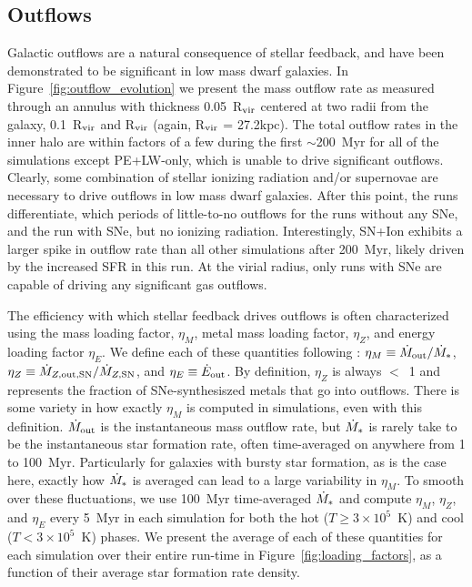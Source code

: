 \documentclass[twocolumn]{aastex62}
\begin{document}
\subsection{Outflows}
\label{sec:outflows}

Galactic outflows are a natural consequence of stellar feedback, and have been demonstrated to be significant in low mass dwarf galaxies. In Figure~\ref{fig:outflow_evolution} we present the mass outflow rate as measured through an annulus with thickness 0.05~R$_{\rm vir}$ centered at two radii from the galaxy, 0.1~R$_{\rm vir}$ and R$_{\rm vir}$ (again, R$_{\rm vir}$ = 27.2kpc). The total outflow rates in the inner halo are within factors of a few during the first $\sim$200~Myr for all of the simulations except PE+LW-only, which is unable to drive significant outflows. Clearly, some combination of stellar ionizing radiation and/or supernovae are necessary to drive outflows in low mass dwarf galaxies. After this point, the runs differentiate, which periods of little-to-no outflows for the runs without any SNe, and the run with SNe, but no ionizing radiation. Interestingly, SN+Ion exhibits a larger spike in outflow rate than all other simulations after 200~Myr, likely driven by the increased SFR in this run. At the virial radius, only runs with SNe are capable of driving any significant gas outflows. 

The efficiency with which stellar feedback drives outflows is often characterized using the mass loading factor, $\eta_M$, metal mass loading factor, $\eta_Z$, and energy loading factor $\eta_E$. We define each of these quantities following \cite{LiBryan2020}: $\eta_M \equiv \dot{M}_{\rm out} / \dot{M}_{\rm *}$, $\eta_Z \equiv \dot{M}_{Z,\rm{out},\rm{SN}} / \dot{M}_{Z,\rm{SN}}$, and $\eta_E \equiv \dot{E}_{\rm out}$. By definition, $\eta_Z$ is always $<$~1 and represents the fraction of SNe-synthesiszed metals that go into outflows. There is some variety in how exactly $\eta_M$ is computed in simulations, even with this definition. $\dot{M}_{\rm out}$ is the instantaneous mass outflow rate, but $\dot{M}_{\rm *}$ is rarely take to be the instantaneous star formation rate, often time-averaged on anywhere from 1 to 100~Myr. Particularly for galaxies with bursty star formation, as is the case here, exactly how $\dot{M}_{\rm *}$ is averaged can lead to a large variability in $\eta_M$. To smooth over these fluctuations, we use 100~Myr time-averaged $\dot{M}_{\rm *}$ and compute $\eta_M$, $\eta_Z$, and $\eta_E$ every 5~Myr in each simulation for both the hot ($T \geq 3 \times 10^5$~K) and cool ($T < 3\times10^5$~K) phases. We present the average of each of these quantities for each simulation over their entire run-time in Figure~\ref{fig:loading_factors}, as a function of their average star formation rate density.
\end{document}
